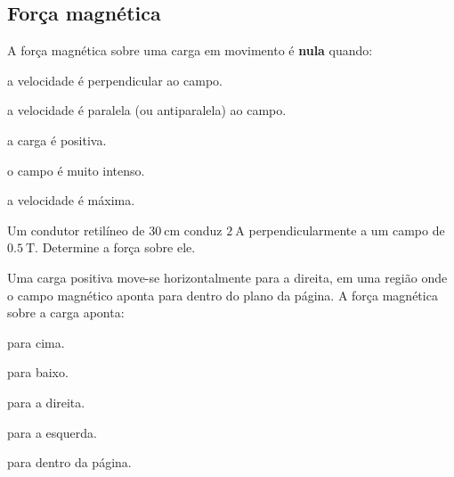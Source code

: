


\subsection{Força magnética}

\blocofixacao

\begin{questao}[1]{}
A força magnética sobre uma carga em movimento é \textbf{nula} quando:
\begin{alternativas}
\item a velocidade é perpendicular ao campo.
\item a velocidade é paralela (ou antiparalela) ao campo.
\item a carga é positiva.
\item o campo é muito intenso.
\item a velocidade é máxima.
\end{alternativas}
\end{questao}

\begin{questao}[1]{}
Um condutor retilíneo de $\SI{30}{\centi\meter}$ conduz $\SI{2}{\ampere}$
perpendicularmente a um campo de $\SI{0.5}{\tesla}$. Determine a força sobre ele.
\end{questao}

\begin{questao}[1]{}
Uma carga positiva move-se horizontalmente para a direita, em uma região onde o
campo magnético aponta para dentro do plano da página. A força magnética sobre a
carga aponta:
\begin{alternativas}[2]
\item para cima.
\item para baixo.
\item para a direita.
\item para a esquerda.
\item para dentro da página.
\end{alternativas}
\end{questao}

